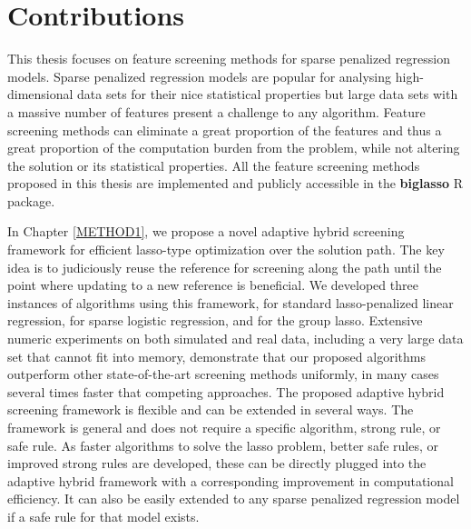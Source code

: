 \label{summary}

\section{Contributions}

This thesis focuses on feature screening methods for sparse penalized regression models. Sparse penalized regression models are popular for analysing high-dimensional data sets for their nice statistical properties but large data sets with a massive number of features present a challenge to any algorithm. Feature screening methods can eliminate a great proportion of the features and thus a great proportion of the computation burden from the problem, while not altering the solution or its statistical properties. All the feature screening methods proposed in this thesis are implemented and publicly accessible in the \textbf{biglasso} R package.

In Chapter \ref{METHOD1}, we propose a novel adaptive hybrid screening framework for efficient lasso-type optimization over the solution path. The key idea is to judiciously reuse the reference for screening along the path until the point where updating to a new reference is beneficial. We developed three instances of algorithms using this framework, for standard lasso-penalized linear regression, for sparse logistic regression, and for the group lasso. Extensive numeric experiments on both simulated and real data, including a very large data set that cannot fit into memory, demonstrate that our proposed algorithms outperform other state-of-the-art screening methods uniformly, in many cases several times faster that competing approaches. The proposed adaptive hybrid screening framework is flexible and can be extended in several ways. The framework is general and does not require a specific algorithm, strong rule, or safe rule. As faster algorithms to solve the lasso problem, better safe rules, or improved strong rules are developed, these can be directly plugged into the adaptive hybrid framework with a corresponding improvement in computational efficiency. It can also be easily extended to any sparse penalized regression model if a safe rule for that model exists.

